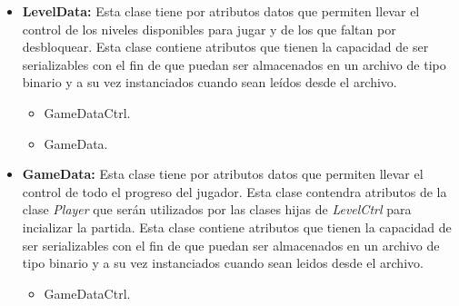 \begin{itemize}
			\item \textbf{LevelData:} Esta clase tiene por atributos datos que permiten 
			llevar el control de los niveles disponibles para jugar y de los que faltan 
			por desbloquear. Esta clase contiene atributos que tienen la capacidad de ser 
			serializables con el fin de que puedan ser almacenados en un archivo de tipo
			binario y a su vez instanciados cuando sean leídos desde el archivo.
			\begin{itemize}
				\item GameDataCtrl.
				\item GameData.
			\end{itemize}
			
			\item \textbf{GameData:} Esta clase tiene por atributos datos que permiten 
			llevar el control de todo el progreso del jugador. Esta clase contendra 
			atributos de la clase \textit{Player} que serán utilizados por las clases hijas de 
			\textit{LevelCtrl} para incializar la partida. Esta clase contiene atributos que tienen
			 la capacidad de ser serializables con el fin de que puedan ser almacenados 
			 en un archivo de tipo binario y a su vez instanciados cuando sean leidos 
			 desde el archivo.
			\begin{itemize}
				\item GameDataCtrl.
			\end{itemize}
			
\end{itemize}	